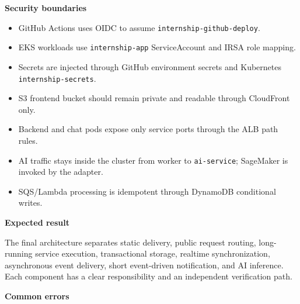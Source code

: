 \vspace{0.5em}\noindent\textbf{Security boundaries}\par

\begin{itemize}
\tightlist
\item
  GitHub Actions uses OIDC to assume \texttt{internship-\allowbreak{}github-\allowbreak{}deploy}.
\item
  EKS workloads use \texttt{internship-\allowbreak{}app} ServiceAccount and IRSA role
  mapping.
\item
  Secrets are injected through GitHub environment secrets and Kubernetes
  \texttt{internship-\allowbreak{}secrets}.
\item
  S3 frontend bucket should remain private and readable through
  CloudFront only.
\item
  Backend and chat pods expose only service ports through the ALB path
  rules.
\item
  AI traffic stays inside the cluster from worker to
  \texttt{ai-\allowbreak{}service}; SageMaker is invoked by the adapter.
\item
  SQS/Lambda processing is idempotent through DynamoDB conditional
  writes.
\end{itemize}

\vspace{0.5em}\noindent\textbf{Expected result}\par

The final architecture separates static delivery, public request
routing, long-running service execution, transactional storage, realtime
synchronization, asynchronous event delivery, short event-driven
notification, and AI inference. Each component has a clear
responsibility and an independent verification path.

\vspace{0.5em}\noindent\textbf{Common errors}\par

